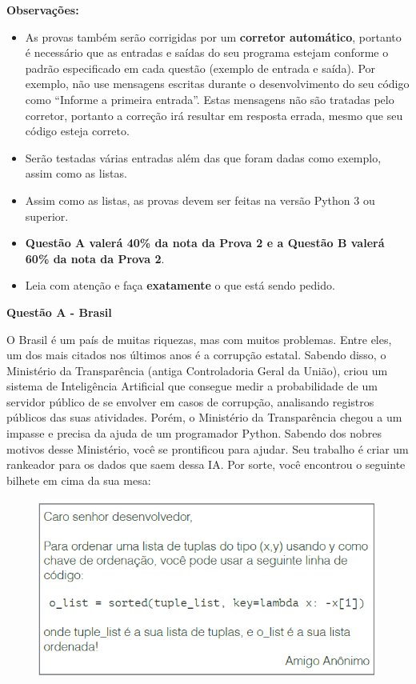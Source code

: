 \documentclass[a4paper, 12pt]{article}
\begin{document}
\textbf{{\large Observações:}}
\begin{itemize}
	\item As provas também serão corrigidas por um \textbf{corretor automático}, portanto é necessário que as entradas e saídas do seu programa estejam conforme o padrão especificado em cada questão (exemplo de entrada e saída). Por exemplo, não use mensagens escritas durante o desenvolvimento do seu código como “Informe a primeira entrada”. Estas mensagens não são tratadas pelo corretor, portanto a correção irá resultar em resposta errada, mesmo que seu código esteja correto.
	\item Serão testadas várias entradas além das que foram dadas como exemplo, assim como as listas.
	\item Assim como as listas, as provas devem ser feitas na versão Python 3 ou superior.
	\item \textbf{Questão A valerá 40\% da nota da Prova 2 e a Questão B valerá 60\% da nota da Prova 2}.
	\item Leia com atenção e faça \textbf{exatamente} o que está sendo pedido.
\end{itemize}
\newpage %
\begin{center}
\textbf{{\Large Questão A - Brasil}}
\end{center}
\vspace{5pt}
O Brasil é um país de muitas riquezas, mas com muitos problemas. Entre
eles, um dos mais citados nos últimos anos é a corrupção estatal. Sabendo disso, o Ministério da Transparência (antiga Controladoria Geral da
União), criou um sistema de Inteligência Artificial que consegue medir a
probabilidade de um servidor público de se envolver em casos de corrupção,
analisando registros públicos das suas atividades. \newline \newline
Porém, o Ministério da Transparência chegou a um impasse e precisa da
ajuda de um programador Python. Sabendo dos nobres motivos desse
Ministério, você se prontificou para ajudar. Seu trabalho é criar um rankeador para os dados que saem dessa IA. Por sorte, você encontrou o seguinte bilhete em cima da sua mesa:
\begin{figure}[H]
	\centering
	\includegraphics[scale=0.6]{bilhete.png}
\end{figure}
\end{document}
